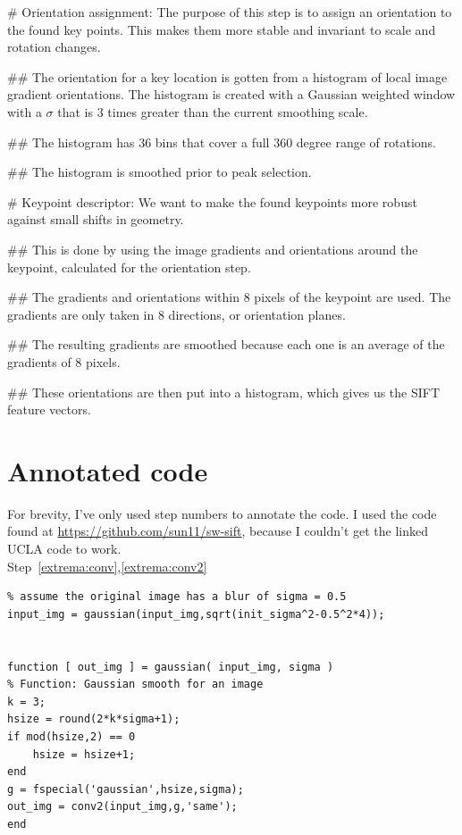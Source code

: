 \begin{easylist}
# Orientation assignment: The purpose of this step is to assign an orientation
to the found key points. This makes them more stable and invariant to scale and
rotation changes.\label{orientation:top}

## The orientation for a key location is gotten from a histogram of local image
gradient orientations. The histogram is created with a Gaussian weighted window
with a \(\sigma\) that is 3 times greater than the current smoothing
scale.\label{orientation:histogram1}

## The histogram has 36 bins that cover a full 360 degree range of
rotations.\label{orientation:histogram2}

## The histogram is smoothed prior to peak
selection.\label{orientation:histogram3}

# Keypoint descriptor: We want to make the found keypoints more robust against
small shifts in geometry.

## This is done by using the image gradients and orientations around the
keypoint, calculated for the orientation step.


## The gradients and orientations within 8 pixels of the keypoint are used. The
gradients are only taken in 8 directions, or orientation
planes.\label{keypoint1}

## The resulting gradients are smoothed because each one is an average of the
gradients of 8 pixels.\label{keypoint2}

## These orientations are then put into a histogram, which gives us the SIFT
feature vectors.\label{keypoint3}
\end{easylist}

\section{Annotated code}

\lstset{language=Matlab}

For brevity, I've only used step numbers to annotate the code. I used the code
found at \url{https://github.com/sun11/sw-sift}, because I couldn't get the
linked UCLA code to work. \\



Step~\ref{extrema:conv},\ref{extrema:conv2}
\begin{lstlisting}
% assume the original image has a blur of sigma = 0.5
input_img = gaussian(input_img,sqrt(init_sigma^2-0.5^2*4));


function [ out_img ] = gaussian( input_img, sigma )
% Function: Gaussian smooth for an image
k = 3;
hsize = round(2*k*sigma+1);
if mod(hsize,2) == 0
    hsize = hsize+1;
end
g = fspecial('gaussian',hsize,sigma);
out_img = conv2(input_img,g,'same');
end
\end{lstlisting}

